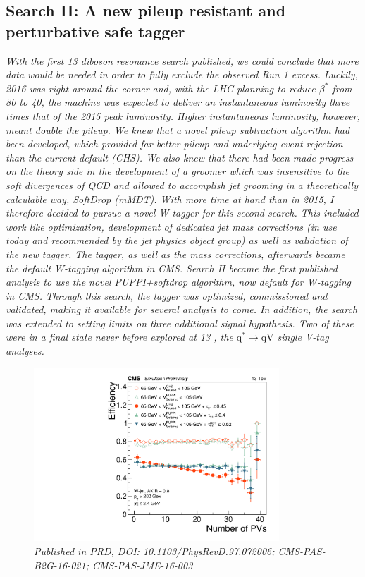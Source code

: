 \vspace*{\fill}
\begin{centering}
\section*{Search II: A new pileup resistant and perturbative safe tagger}
\label{searchII}
\textit{
With the first 13 \TeV diboson resonance search published, we could conclude that more data would be needed in order to fully exclude the observed Run 1 excess. Luckily, 2016 was right around the corner and, with the LHC planning to reduce $\beta^*$ from 80 \cm to 40, the machine was expected to deliver an instantaneous luminosity three times that of the 2015 peak luminosity. Higher instantaneous luminosity, however, meant double the pileup.
\newline
\newline
We knew that a novel pileup subtraction algorithm had been developed, which provided far better pileup and underlying event rejection than the current default (CHS). We also knew that there had been made progress on the theory side in the development of a groomer which was insensitive to the soft divergences of QCD and allowed to accomplish jet grooming in a theoretically calculable way, SoftDrop (mMDT). With more time at hand than in 2015, I therefore decided to pursue a novel W-tagger for this second search. This included work like optimization, development of dedicated jet mass corrections (in use today and recommended by the jet physics object group) as well as validation of the new tagger. The tagger, as well as the mass corrections, afterwards became the default W-tagging algorithm in CMS.
\newline
\newline
Search II became the first published analysis to use the novel PUPPI+softdrop algorithm, now default for W-tagging in CMS. Through this search, the tagger was optimized, commissioned and validated, making it available for several analysis to come. In addition, the search was extended to setting limits on three additional signal hypothesis. Two of these were in a final state never before explored at 13 \TeV, the $\textrm{q}^* \rightarrow \textrm{qV}$ single V-tag analyses.
}
\end{centering}
\begin{figure}[b!]
    \centering
    \includegraphics[height=6.5cm]{figures/vtagging/JME-16-003/BoostedW/WtagSigEffvsNPV.pdf}
    \vspace*{10mm}
    \caption*{\footnotesize{\textit{Published in PRD, DOI: 10.1103/PhysRevD.97.072006; CMS-PAS-B2G-16-021; CMS-PAS-JME-16-003}}}
\end{figure}
